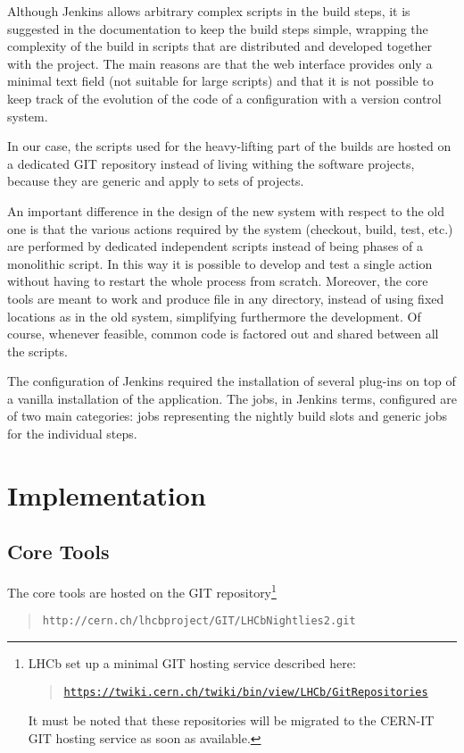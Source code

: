 \documentclass{lhcbnote}
\newcommand{\link}[2]{\href{#1}{#2}}
\newcommand{\urlLink}[1]{\link{#1}{\texttt{#1}}}
\begin{document}
Although Jenkins allows arbitrary complex scripts in the build steps, it is
suggested in the documentation to keep the build steps simple, wrapping the
complexity of the build in scripts that are distributed and developed together
with the project.  The main reasons are that the web interface provides only a
minimal text field (not suitable for large scripts) and that it is not possible
to keep track of the evolution of the code of a configuration with a version
control system.

In our case, the scripts used for the heavy-lifting part of the builds are
hosted on a dedicated GIT\cite{GIT} repository instead of living withing the
software projects, because they are generic and apply to sets of projects.

An important difference in the design of the new system with respect to the old
one is that the various actions required by the system (checkout, build, test,
etc.) are performed by dedicated independent scripts instead of being phases of
a monolithic script.  In this way it is possible to develop and test a single
action without having to restart the whole process from scratch.  Moreover, the
core tools are meant to work and produce file in any directory, instead of using
fixed locations as in the old system, simplifying furthermore the development.
Of course, whenever feasible, common code is factored out and shared between all
the scripts.

The configuration of Jenkins required the installation of several plug-ins on
top of a vanilla installation of the application.  The jobs, in Jenkins terms,
configured are of two main categories: jobs representing the nightly build slots
and generic jobs for the individual steps.

\section{Implementation}
\subsection{Core Tools}
The core tools are hosted on the GIT repository\footnote{%
  LHCb set up a minimal GIT hosting service described here:
  \begin{quote}
    \urlLink{https://twiki.cern.ch/twiki/bin/view/LHCb/GitRepositories}
  \end{quote}
  It must be noted that these repositories will be migrated to the CERN-IT GIT
  hosting service as soon as available.}
\begin{quote}
  \texttt{http://cern.ch/lhcbproject/GIT/LHCbNightlies2.git}
\end{quote}
\end{document}
